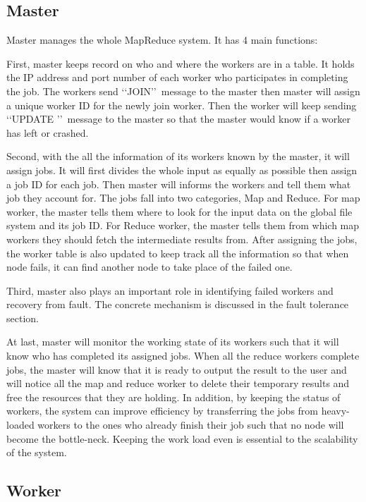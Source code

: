 \documentclass[12pt]{article}
\begin{document}
\subsection{Master}

Master manages the whole MapReduce system. It has 4 main functions: 

First, master keeps record on who and where the workers are in a table. It holds the IP address and 
port number of each worker who participates in completing the job. The workers send \lq\lq JOIN\rq\rq\  
message to the master then master will assign a unique worker ID for the newly join worker.
Then the worker will keep sending \lq\lq UPDATE \rq\rq\ message to the master so that the master would know
if a worker has left or crashed.
  
Second, with the all the information of its workers known by the master, it will assign jobs. It will
first divides the whole input as equally as possible then assign a job ID for each job. Then master will informs the workers and tell them 
what job they account for. The jobs fall into two categories, Map and Reduce. For map worker, the master tells
them where to look for the input data on the global file system and its job ID. For Reduce worker, the master tells
them from which map workers they should fetch the intermediate results from. After assigning the jobs, the worker table
is also updated to keep track all the information so that when node fails, it can find another node to take place of the 
failed one.

Third, master also plays an important role in identifying failed workers and recovery from fault. The concrete mechanism
is discussed in the fault tolerance section.

At last, master will monitor the working state of its workers such that it will know who has completed its assigned jobs. When all 
the reduce workers complete jobs, the master will know that it is ready to output the result to the user and will notice all the map and
reduce worker to delete their temporary results and free the resources that they are holding. In addition, by keeping the status of workers,
the system can improve efficiency by transferring the jobs from heavy-loaded workers to the ones who already finish their job such that no
node will become the bottle-neck. Keeping the work load even is essential to the scalability of the system.   
\subsection{Worker}
\end{document}
